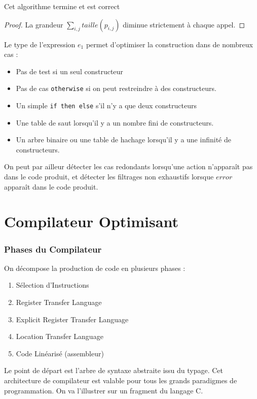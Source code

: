 \documentclass{cours}
\begin{document}
\begin{proposition}
    Cet algorithme termine et est correct
\end{proposition}
\begin{proof}
    La grandeur $\sum_{i, j} taille(p_{i, j})$ diminue strictement à chaque appel.
\end{proof}

Le type de l'expression $e_{1}$ permet d'optimiser la construction dans de nombreux cas :
\begin{itemize}
    \item Pas de test si un seul constructeur
    \item Pas de cas \texttt{otherwise} si on peut restreindre à des constructeurs.
    \item Un simple \texttt{if then else} s'il n'y a que deux constructeurs
    \item Une table de saut lorsqu'il y a un nombre fini de constructeurs.
    \item Un arbre binaire ou une table de hachage lorsqu'il y a une infinité de constructeurs.
\end{itemize}

On peut par ailleur détecter les cas redondants lorsqu'une action n'apparaît pas dans le code produit, et détecter les filtrages non exhaustifs lorsque $error$ apparaît dans le code produit.

\part{Compilateur Optimisant}
\localtableofcontents
\section{Phases du Compilateur}
On décompose la production de code en plusieurs phases :
\begin{enumerate}
    \item Sélection d'Instructions
    \item Register Transfer Language
    \item Explicit Register Transfer Language
    \item Location Transfer Language
    \item Code Linéarisé (assembleur)
\end{enumerate}

Le point de départ est l'arbre de syntaxe abstraite issu du typage. Cet architecture de compilateur est valable pour tous les grands paradigmes de programmation. On va l'illustrer sur un fragment du langage C.
\end{document}
